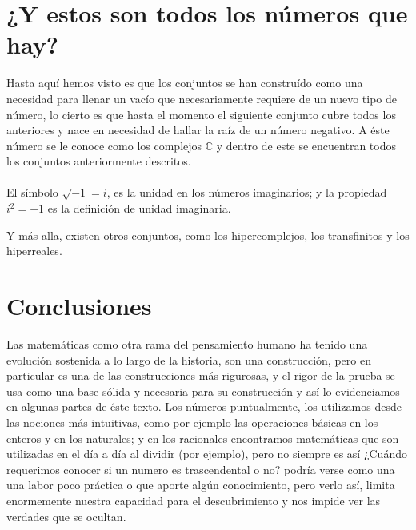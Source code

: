 \documentclass{article}
\begin{document}
\section{¿Y estos son todos los números que hay?}

Hasta aquí hemos visto es que los conjuntos se han construído como una necesidad para llenar un vacío que necesariamente requiere de un nuevo tipo de número, lo cierto es que hasta el momento el siguiente conjunto cubre todos los anteriores y nace en necesidad de hallar la raíz de un número negativo. A éste número se le conoce como los complejos $\mathbb{C}$ y dentro de este se encuentran todos los conjuntos anteriormente descritos.

\paragraph{} El símbolo $\sqrt{-1} = i$, es la unidad en los números imaginarios; y la propiedad $i^2 = -1$ es la definición de unidad imaginaria\cite{patino_duque_1977}.

Y más alla, existen otros conjuntos, como los hipercomplejos, los transfinitos y los hiperreales.

\section{Conclusiones}
Las matemáticas como otra rama del pensamiento humano ha tenido una evolución sostenida a lo largo de la historia, son una construcción, pero en particular es una de las construcciones más rigurosas, y el rigor de la prueba se usa como una base sólida y necesaria para su construcción y así lo evidenciamos en algunas partes de éste texto. Los números puntualmente, los utilizamos desde las nociones más intuitivas, como por ejemplo las operaciones básicas en los enteros y en los naturales; y en los racionales encontramos matemáticas que son utilizadas en el día a día al dividir (por ejemplo), pero no siempre es así ¿Cuándo requerimos conocer si un numero es trascendental o no? podría verse como una una labor poco práctica o que aporte algún conocimiento, pero verlo así, limita enormemente nuestra capacidad para el descubrimiento y nos impide ver las verdades que se ocultan.

\nocite{*}


\end{document}
